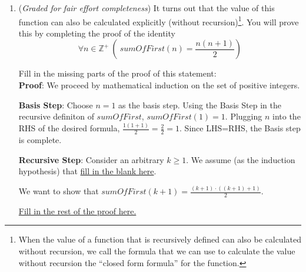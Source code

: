 \begin{enumerate}
\begin{enumerate}
        Give a recursive definition of this function, including domain, codomain and both the basis step
        and recursive step of the rule. That is, fill in the blanks 
        \[
            sumOfFirst: \underline{~~domain~~} \to \underline{~~codomain}
        \]
        given by 
        \begin{align*}
            &\textbf{Basis step}: \underline{\text{fill in basis step}} \\
            &\textbf{Recursive step}: \underline{\text{fill in recursive step}}
        \end{align*}

        {\it Notation}: Using summation, this function can be written $sumOfFirst(n) = \sum_{i=1}^n i$.\\


        \item ({\it Graded for fair effort completeness}) It turns out that the value of this function
        can also be calculated explicitly (without recursion)\footnote{When the value of a function 
        that is recursively defined can also be calculated without recursion, we call the formula 
        that we can use to calculate the value without recursion the ``closed form formula'' for the 
        function.}. You will 
        prove this by completing the proof of the identity
        \[
            \forall n \in \mathbb{Z}^+ ~\left(~sumOfFirst(n) = \frac{n(n+1)}{2} \right)
        \]
        
        Fill in the missing parts of the proof of this statement:\\

        {\bf Proof}: We proceed by mathematical induction on the set of positive integers.

        {\bf Basis Step}: Choose $n = 1$ as the basis step. 
        Using the Basis Step in the recursive definiton of $sumOfFirst$, 
        $sumOfFirst(1) = 1$. Plugging $n$ into the RHS of the desired formula,
        $\frac{1 (1+1)}{2} = \frac{2}{2} = 1$. Since LHS=RHS, the Basis step is complete.
   
        {\bf Recursive Step}: Consider an arbitrary $k \geq 1$.  
        We assume (as the induction hypothesis) that \underline{fill in the blank here}. 
   
        We want to show that $sumOfFirst(k+1) = \frac{(k + 1) \cdot ((k + 1) + 1)}{2}$.
   
        \underline{Fill in the rest of the proof here.} \\


\end{enumerate}
\end{enumerate}
